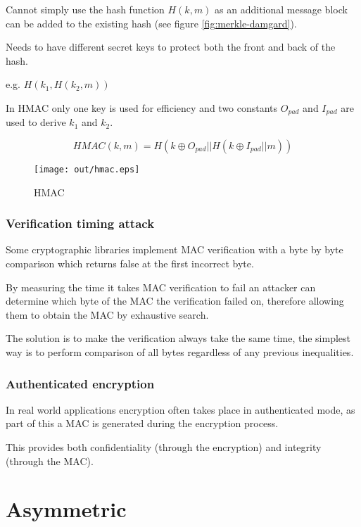 \documentclass[a4paper]{article}
\begin{document}
Cannot simply use the hash function $H(k, m)$ as an additional message block can
be added to the existing hash (see figure \ref{fig:merkle-damgard}).


Needs to have different secret keys to protect both the front and back of the
hash.

e.g. $H(k_{1}, H(k_{2}, m))$

In HMAC only one key is used for efficiency and two constants $O_{pad}$ and
$I_{pad}$ are used to derive $k_{1}$ and $k_{2}$.

\[
  HMAC(k, m) = H(k \oplus O_{pad} || H(k \oplus I_{pad} || m))
\]

\begin{figure}[h!]
  \centering
  \texttt{[image: out/hmac.eps]}
  \caption{HMAC}
  \label{fig:hmac}
\end{figure}
\FloatBarrier

\subsubsection{Verification timing attack}

Some cryptographic libraries implement MAC verification with a byte by byte
comparison which returns false at the first incorrect byte.

By measuring the time it takes MAC verification to fail an attacker can
determine which byte of the MAC the verification failed on, therefore allowing
them to obtain the MAC by exhaustive search.

The solution is to make the verification always take the same time, the simplest
way is to perform comparison of all bytes regardless of any previous
inequalities.

\subsubsection{Authenticated encryption}

In real world applications encryption often takes place in authenticated mode,
as part of this a MAC is generated during the encryption process.

This provides both confidentiality (through the encryption) and integrity
(through the MAC).

\section{Asymmetric}
\end{document}
